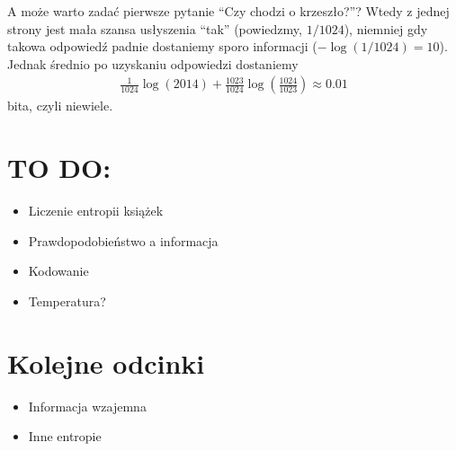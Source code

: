 \documentclass[10pt,a4paper]{article}
\begin{document}
A może warto zadać pierwsze pytanie ``Czy chodzi o krzeszło?''? Wtedy z jednej strony jest mała szansa usłyszenia ``tak'' (powiedzmy, $1/1024$), niemniej gdy takowa odpowiedź padnie dostaniemy sporo informacji  ($-\log(1/1024)=10$). Jednak średnio po uzyskaniu odpowiedzi dostaniemy
\begin{align}
    \tfrac{1}{1024} \log(2014) + \tfrac{1023}{1024} \log(\tfrac{1024}{1023}) \approx 0.01
\end{align}
bita, czyli niewiele.

\section{TO DO:}

\begin{itemize}
    \item Liczenie entropii książek
    \item Prawdopodobieństwo a informacja
    \item Kodowanie
    \item Temperatura?
\end{itemize}

\section{Kolejne odcinki}

\begin{itemize}
    \item Informacja wzajemna
    \item Inne entropie
\end{itemize}


\end{document}
